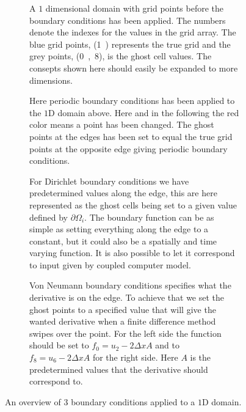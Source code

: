 	\begin{figure}
		\centering
		\begin{subfigure}[b]{0.9\textwidth}
			\centering
			
			\caption{A \(1\) dimensional domain with grid points before the boundary conditions has been applied.
			The numbers denote the indexes for the values in the grid array. The blue grid points, (\si{1}) represents
			the true grid and the grey points, (\si{0,8}), is the ghost cell values. The consepts shown here should easily be
			expanded to more dimensions.}
			\label{fig:initial}
		\end{subfigure}
		\begin{subfigure}[b]{0.9\textwidth}
			\centering
			
			\caption{Here periodic boundary conditions has been applied to the \(1\)D domain above. Here and in the following the
			red color means a point has been changed. The ghost points at the edges has been set to equal the
			true grid points at the opposite edge giving periodic boundary conditions.}
			\label{fig:periodic}
		\end{subfigure}
		\begin{subfigure}[b]{0.9\textwidth}
			\centering
			
			\caption{For Dirichlet boundary conditions we have predetermined values along the edge, this are here represented as the ghost cells
			being set to a given value defined by \(\partial\Omega_i\). The boundary function can be as simple as setting everything along
			the edge to a constant, but it could also be a spatially and time varying function. It is also possible to let it correspond to
			input given by coupled computer model.}
			\label{fig:dirichlet}
		\end{subfigure}
		\begin{subfigure}[b]{0.9\textwidth}
			\centering
			
			\caption{Von Neumann boundary conditions specifies what the derivative is on the edge. To achieve that we set the ghost points to
			a specified value that will give the wanted derivative when a finite difference method swipes over the point. For the left side
			the function should be set to \(f_0 = u_2 - 2\Delta x A\) and to \(f_8 = u_6 - 2\Delta x A\) for the right side. Here \(A\) is the
			predetermined values that the derivative should correspond to.}
			\label{fig:neumann}
		\end{subfigure}
		\caption{An overview of 3 boundary conditions applied to a \(1\)D domain.}
	\end{figure}



